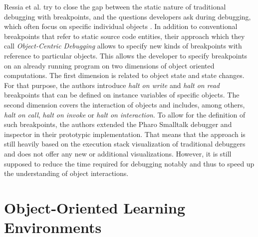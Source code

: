 Ressia et al. try to close the gap between the static nature of traditional  debugging with breakpoints, and the questions developers ask during debugging,  which often focus on specific individual objects \cite{ressia_object-centric_2012}.
In addition to conventional breakpoints that refer to static source code entities, their approach which they call \emph{Object-Centric Debugging} allows to specify new kinds of breakpoints with reference to particular objects.
 This allows the developer to specify breakpoints on an already running program on two dimensions of object oriented computations.
The first dimension is related to object state and state changes.
For that purpose, the authors introduce \emph{halt on write} and \emph{halt on read} breakpoints that can be defined on instance variables of specific objects.
The second dimension covers the interaction of objects and includes, among others, \emph{halt on call}, \emph{halt on invoke} or \emph{halt on interaction}.
To allow for the definition of such breakpoints, the authors extended the Pharo Smalltalk debugger and inspector in their prototypic implementation.
That means that the approach is still heavily based on the execution stack visualization of traditional debuggers and does not offer any new or additional visualizations.
However, it is still supposed to reduce the time required for debugging notably and thus to speed up the understanding of object interactions.

\section{Object-Oriented Learning Environments}
